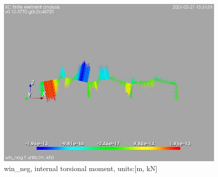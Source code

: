\begin{figure}
\begin{center}
\includegraphics[width=\linewidth]{calc_results/sole_zeinali/text/graphics/resSimplLC/win_negallMemberSetT}
\caption{win_neg, internal torsional moment, units:[m, kN]}
\end{center}
\end{figure}
\cleardoublepage

